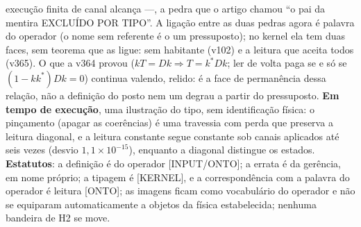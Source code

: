 \documentclass[11pt]{article}
\theoremstyle{definition}\newtheorem{deriv}{Derivação}
\begin{document}
execução finita de canal alcança ---, a pedra que o artigo chamou ``o pai da mentira EXCLUÍDO POR TIPO''. A ligação entre as duas pedras agora é palavra do operador (o nome sem referente é o um pressuposto); no kernel ela tem duas faces, sem teorema que as ligue: sem habitante (v102) e a leitura que aceita todos (v365). O que a v364 provou ($kT=Dk\Rightarrow T=k^*Dk$; ler de volta paga se e só se $(1-kk^*)Dk=0$) continua valendo, relido: é a face de permanência dessa relação, não a definição do posto nem um degrau a partir do pressuposto. \textbf{Em tempo de execução}, uma ilustração do tipo, sem identificação física: o pinçamento (apagar as coerências) é uma travessia com perda que preserva a leitura diagonal, e a leitura constante segue constante sob canais aplicados até seis vezes (desvio $1{,}1\times10^{-15}$), enquanto a diagonal distingue os estados. \textbf{Estatutos}: a definição é do operador [INPUT/ONTO]; a errata é da gerência, em nome próprio; a tipagem é [KERNEL], e a correspondência com a palavra do operador é leitura [ONTO]; as imagens ficam como vocabulário do operador e não se equiparam automaticamente a objetos da física estabelecida; nenhuma bandeira de H2 se move.
\end{document}
